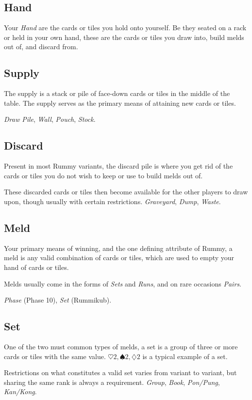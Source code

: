 \subsection{Hand}
Your \textit{Hand} are the cards or tiles you hold onto yourself. Be they seated on a rack or held in your own hand, these are the cards or tiles you draw into, build melds out of, and discard from.

\subsection{Supply}
The supply is a stack or pile of face-down cards or tiles in the middle of the table.
The supply serves as the primary means of attaining new cards or tiles.

\otherNames \textit{Draw Pile}, \textit{Wall}, \textit{Pouch}, \textit{Stock}.
\subsection{Discard}
Present in most Rummy variants, the discard pile is where you get rid of the cards or tiles you do not wish to keep or use to build melds out of.

These discarded cards or tiles then become available for the other players to draw upon, though usually with certain restrictions.
\otherNames \textit{Graveyard}, \textit{Dump}, \textit{Waste}.
\subsection{Meld}
Your primary means of winning, and the one defining attribute of Rummy, a meld is any valid combination of cards or tiles, which are used to empty your hand of cards or tiles.

Melds usually come in the forms of \textit{Sets} and \textit{Runs}, and on rare occasions \textit{Pairs}.

\otherNames \textit{Phase} (Phase 10), \textit{Set} (Rummikub).
\subsection{Set}
One of the two must common types of melds, a set is a group of three or more cards or tiles with the same value. $\heartsuit 2, \spadesuit 2, \diamondsuit 2$ is a typical example of a set.

Restrictions on what constitutes a valid set varies from variant to variant, but sharing the same rank is always a requirement.
\otherNames \textit{Group}, \textit{Book}, \textit{Pon/Pung}, \textit{Kan/Kong}.
